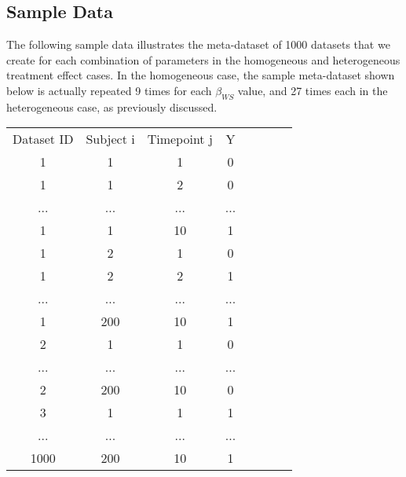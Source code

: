 \documentclass{article}
\begin{document}
    \subsection{Sample Data}
        The following sample data illustrates the meta-dataset of 1000 datasets that we create for each combination of parameters in the homogeneous and heterogeneous treatment effect cases. In the homogeneous case, the sample meta-dataset shown below is actually repeated 9 times for each $\beta_{WS}$ value, and 27 times each in the heterogeneous case, as previously discussed. \\
        
        \begin{table}
        
        \centering
        \begin{tabular}{c c c c c c c c}
                Dataset ID & Subject i & Timepoint j & Y\\
                1           & 1           & 1   & 0 \\
                1           & 1           & 2   & 0 \\
                ...           & ...           & ...   & ... \\
                1           & 1           & 10   & 1 \\
                1           & 2           & 1   & 0 \\
                1           & 2           & 2   & 1 \\
                ...           & ...           & ...   & ... \\
                1           & 200           & 10   & 1 \\
                2           & 1           & 1   & 0 \\
                ...           & ...           & ...   & ... \\
                2           & 200           & 10   & 0 \\
                3           & 1           & 1   & 1 \\
                ...           & ...           & ...   & ... \\
                1000           & 200           & 10   & 1 \\
        \end{tabular}
        \end{table} 
        
        
    \FloatBarrier
     
        
        
\end{document}
